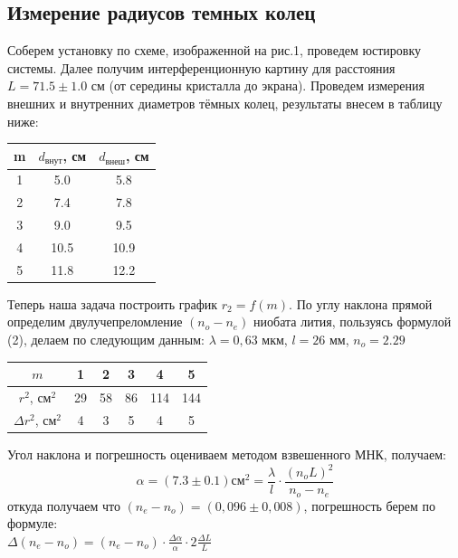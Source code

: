 \documentclass[a4paper,12pt]{extarticle}
\begin{document}
\subsection*{Измерение радиусов темных колец}
Соберем установку по схеме, изображенной на рис.1, проведем юстировку системы. Далее получим интерференционную картину для расстояния $L =  71.5 \pm 1.0$ см (от середины кристалла до экрана). Проведем измерения внешних и внутренних диаметров тёмных колец, результаты внесем в таблицу ниже: 
\begin{table}[H]
\begin{tabular}{|c|c|c|}
\hline
m & $d_{\text{внут}}$, см & $d_{\text{внеш}}$, см \\ \hline
1 & 5.0    & 5.8    \\ \hline
2 & 7.4    & 7.8    \\ \hline
3 & 9.0    & 9.5    \\ \hline
4 & 10.5   & 10.9   \\ \hline
5 & 11.8   & 12.2   \\ \hline
\end{tabular}
\end{table}
Теперь наша задача построить график $r_2 = f(m)$. По углу наклона прямой определим
двулучепреломление $(n_o - n_e)$ ниобата лития, пользуясь формулой (2), делаем по следующим данным:
$\lambda = 0,63$ мкм, $l = 26$ мм, $n_o = 2.29$
\begin{table}[H]
\begin{tabular}{|c|c|c|c|c|c|}
\hline
$m$  & 1  & 2  & 3  & 4   & 5   \\ \hline
$r^2$, см$^2$       & 29 & 58 & 86 & 114 & 144 \\ \hline
$\Delta r^2$, см$^2$ & 4  & 3  & 5  & 4   & 5   \\ \hline
\end{tabular}
\end{table}
\begin{minipage}{1\textwidth}
    \end{minipage}
Угол наклона и погрешность оцениваем методом взвешенного МНК, получаем:
$$ \alpha = (7.3\pm0.1) \text{см}^2 = \frac{\lambda}{l} \cdot \frac{(n_o L)^2}{n_o - n_e}$$
откуда получаем что $(n_e - n_o) = (0,096 \pm 0,008)$, погрешность берем по формуле: \\ $\Delta (n_e - n_o) = (n_e - n_o) \cdot \frac{\Delta \alpha}{\alpha} \cdot 2\frac{\Delta L}{L}$
\end{document}
